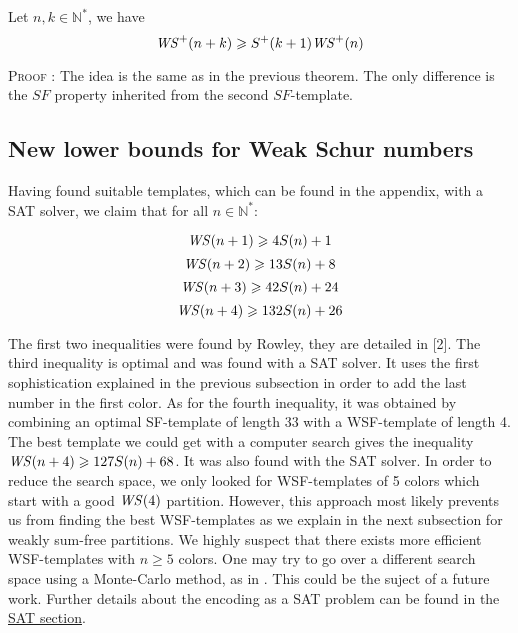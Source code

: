\begin{corollary}
	Let \(n, k \in \mathbb{N}^*\), we have \\
	\[ \mathit{WS}^+(n+k) \geqslant S^+(k+1) \mathit{WS}^+(n) \]
\end{corollary}

\textsc{Proof :} The idea is the same as in the previous theorem. The only difference is the \(SF\) property inherited
from the second \(SF\)-template.



\subsection{New lower bounds for Weak Schur numbers}
Having found suitable templates, which can be found in the appendix, with a SAT solver, we claim that for all \(n \in
\mathbb{N}^*\):

\[
\mathit{WS}(n+1) \geqslant 4S(n) + 1 
\]
\[
\mathit{WS}(n+2) \geqslant 13S(n) + 8
\]
\[
\mathit{WS}(n+3) \geqslant 42S(n) + 24
\]
\[
\mathit{WS}(n+4) \geqslant 132S(n) + 26
\]

The first two inequalities were found by Rowley, they are detailed in [2]. The third inequality is optimal and was found with a SAT solver.
It uses the first sophistication explained in the previous subsection in order to add the last number in the first color.
As for the fourth inequality, it was obtained by combining an optimal SF-template of length 33 with a WSF-template of length 4.
The best template we could get with a computer search gives the inequality \(\mathit{WS}(n+4) \geqslant 127 S(n) + 68\).
It was also found with the SAT solver. In order to reduce the search space, we only looked for WSF-templates of
5 colors which start with a good \(\mathit{WS}(4)\) partition. However, this approach most likely prevents us from finding the best WSF-templates
as we explain in the next subsection for weakly sum-free partitions. We highly suspect that there exists more efficient WSF-templates
with \(n \geqslant 5\) colors. One may try to go over a different search space using a Monte-Carlo method, as in \cite{Bouzy2015AnAP}.
This could be the suject of a future work. Further details about the encoding as a SAT problem can be found in the
\hyperref[SAT]{SAT section}. \\

